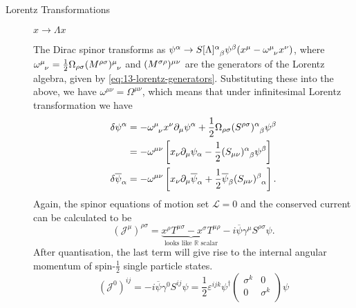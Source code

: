 
\begin{description}
  \item[Lorentz Transformations] $x \to \Lambda x$ \par
    The Dirac spinor transforms as
    $\psi^{\alpha} \to S[\Lambda] \indices{^{\alpha}_{\beta}} \psi^{\beta} (x^{\mu} - \omega \indices{^{\mu}_{\nu}} x^{\nu})$, where $\omega \indices{^{\mu}_{\nu}} = \frac{1}{2} \Omega_{\rho\sigma} (M^{\rho\sigma}) \indices{^{\mu}_{\nu}}$ and $(M^{\sigma\rho})\indices{^{\mu}^{\nu}}$ are the generators of the Lorentz algebra, given by \eqref{eq:13-lorentz-generators}.
    Substituting these into the above, we have $\omega^{\mu\nu} = \Omega^{\mu\nu}$, which means that under infinitesimal Lorentz transformation we have
    \begin{align}
      \delta \psi^{\alpha} &= - \omega \indices{^{\mu}_{\nu}} x^{\nu} \partial_{\mu} \psi^{\alpha} + \frac{1}{2} \Omega_{\rho\sigma} (S^{\rho\sigma}) \indices{^{\alpha}_{\beta}} \psi^{\beta} \\
			   &= - \omega^{\mu\nu} \left[ x_{\nu} \partial_{\mu} \psi_{\alpha} - \frac{1}{2} (S_{\mu\nu}) \indices{^{\alpha}_{\beta}} \psi^{\beta} \right] \\
      \delta \overline{\psi}_{\alpha} &= -\omega^{\mu\nu} \left[ x_{\nu} \partial_{\mu} \overline{\psi}_{\alpha} + \frac{1}{2} \overline{\psi}_{\beta} (S_{\mu\nu}) \indices{^{\beta}_{\alpha}} \right].
    \end{align}
    Again, the spinor equations of motion set $\mathcal{L} = 0$ and the conserved current can be calculated to be
    \begin{equation}
      (\mathcal{J}^{\mu})^{\rho\sigma} = \underbrace{x^{\rho} T^{\mu\sigma} - x^{\sigma} T^{\mu\rho}}_{\text{looks like } \mathbb{R} \text{ scalar}} -i \overline{\psi} \gamma^{\mu} S^{\rho\sigma} \psi.
    \end{equation}
    After quantisation, the last term will give rise to the internal angular momentum of spin-$\frac{1}{2}$ single particle states.
    \begin{equation}
      (\mathcal{J}^0)^{ij} = -i \overline{\psi} \gamma^0 S^{ij} \psi = \frac{1}{2} \varepsilon^{ijk} \psi^{\dagger}
      \begin{pmatrix}
       \sigma^{k} & 0 \\
       0 & \sigma^{k} \\
      \end{pmatrix} \psi

\end{equation}
\end{description}
